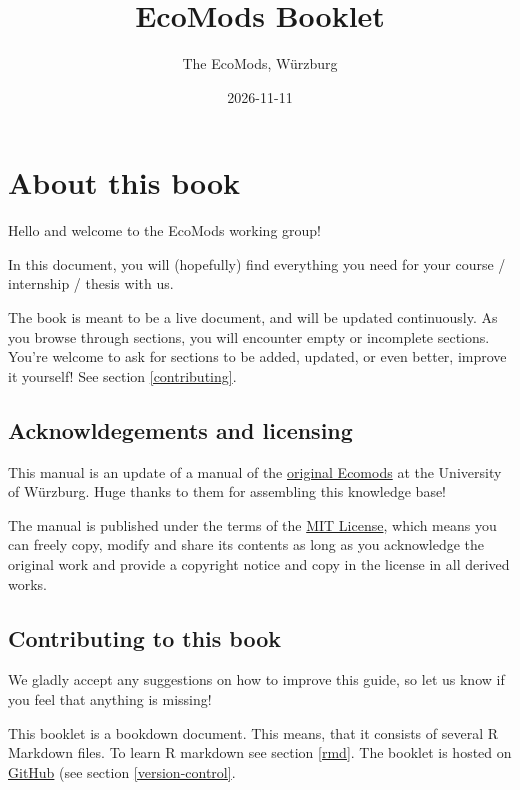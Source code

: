 \documentclass[
]{book}
\title{EcoMods Booklet}
\author{The EcoMods, Würzburg}
\date{2026-11-11}
\begin{document}
\maketitle

{
\setcounter{tocdepth}{1}
\tableofcontents
}
\chapter{About this book}\label{about-this-book}

Hello and welcome to the EcoMods working group!

In this document, you will (hopefully) find everything you need for your course / internship / thesis with us.

The book is meant to be a live document, and will be updated
continuously. As you browse through sections, you will encounter empty
or incomplete sections. You're welcome to ask for sections to be added,
updated, or even better, improve it yourself! See section
\ref{contributing}.

\section{Acknowldegements and licensing}\label{acknowldegements-and-licensing}

This manual is an update of a manual of the \href{CCTB-Ecomods/Ecomods-Booklet}{original
Ecomods} at the University of Würzburg.
Huge thanks to them for assembling this knowledge base!

The manual is published under the terms of the \href{https://github.com/biob-ecomod/ecomods_booklet/blob/main/LICENSE}{MIT
License},
which means you can freely copy, modify and share its contents as long
as you acknowledge the original work and provide a copyright notice and
copy in the license in all derived works.

\section{Contributing to this book}\label{contributing-to-this-book}

We gladly accept any suggestions on how to improve this guide, so let us
know if you feel that anything is missing!

This booklet is a bookdown document. This means, that it consists of
several R Markdown files. To learn R markdown see section \ref{rmd}.
The booklet is hosted on
\href{https://github.com/CCTB-Ecomods/Ecomods-Booklet}{GitHub} (see section
\ref{version-control}.
\end{document}
